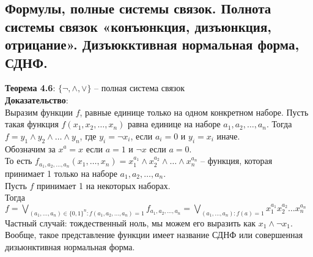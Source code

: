 \subsection{Формулы, полные системы связок. Полнота системы связок «конъюнкция, дизъюнкция, отрицание». Дизъюкктивная нормальная форма, СДНФ.}
\textbf{Теорема 4.6}: $\{\neg, \wedge, \vee\}$ -- полная система связок\\

\noindent \textbf{Доказательство}:\\

Выразим функции $f$, равные единице только на одном конкретном наборе. Пусть такая функция $f(x_1, x_2, \ldots, x_n)$ равна единице на наборе $a_1, a_2, \ldots, a_n$. Тогда $f = y_1 \wedge y_2 \wedge \ldots \wedge y_n$, где $y_i = \neg x_i$, если $a_i = 0$ и $y_i = x_i$ иначе.\\

Обозначим за $x^a = x$ если $a = 1$ и $\neg x$ если $a = 0$.\\

То есть $f_{a_1, a_2, \ldots, a_n}(x_1, \ldots, x_n) = x_1^{a_1} \wedge x_2^{a_2} \wedge \ldots \wedge x_n^{a_n}$ -- функция, которая принимает 1 только на наборе $a_1, a_2, \ldots, a_n$.\\

Пусть $f$ принимает 1 на некоторых наборах.\\

Тогда $f = \bigvee\limits_{(a_1, \ldots, a_n) \in \{0, 1\}^n : f(a_1, a_2, \ldots, a_n) = 1} f_{a_1, a_2, \ldots, a_n} = \bigvee\limits_{(a_1, \ldots, a_n): f(a) = 1}x_1^{a_1}x_2^{a_2}\ldots x_n^{a_n}$\\

Частный случай: тождественный ноль, мы можем его выразить как $x_1 \wedge \neg x_1$.\\

Вообще, такое представление функции имеет название СДНФ или совершенная дизьюнктивная нормальная форма.\\